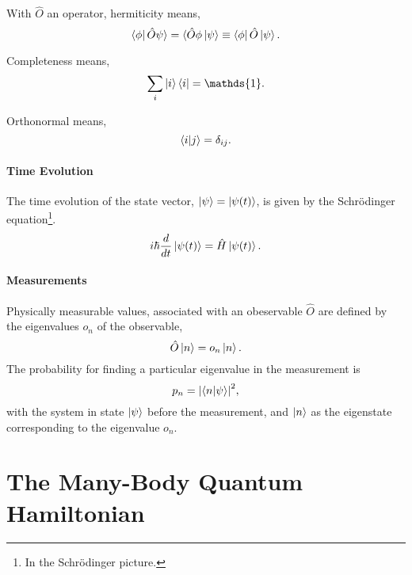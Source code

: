     With $\hat{O}$ an operator, hermiticity means,
    \begin{equation}
        \bra{\phi}\hat{O}\psi\rangle = \langle\hat{O}\phi\ket{\psi} \equiv \bra{\phi} \hat{O} \ket{\psi}.
    \end{equation}

    Completeness means,
    \begin{equation}
        \sum_i \ket{i}\bra{i} = \mathds{1}.
    \end{equation}

    Orthonormal means,
    \begin{equation}
        \braket{i}{j} = \delta_{ij}.
    \end{equation}

    \paragraph{Time Evolution}
    The time evolution of the state vector, $\ket{\psi} = \ket{\psi (t)}$, is given by the Schrödinger
    equation\footnote{In the Schrödinger picture.}.
    \begin{equation}
        i\hbar \frac{d}{dt} \ket{\psi (t)} = \hat{H} \ket{\psi (t)}.
    \end{equation}

    \paragraph{Measurements}
    Physically measurable values, associated with an obeservable $\hat{O}$ are defined by the 
    eigenvalues $o_n$ of the observable,
    \begin{equation}
        \hat{O}\ket{n} = o_n\ket{n}.
    \end{equation}
    The probability for finding a particular eigenvalue in the measurement is
    \begin{equation}
        p_n = \abs{\braket{n}{\psi}}^2,
    \end{equation}
    with the system in state $\ket{\psi}$ before the measurement, and $\ket{n}$ as the 
    eigenstate corresponding to the eigenvalue $o_n$.

\section{The Many-Body Quantum Hamiltonian}

